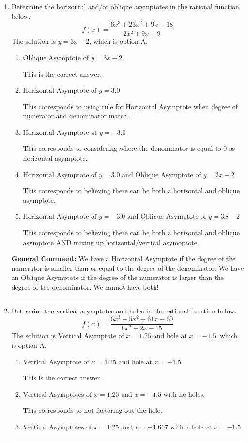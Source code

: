 \documentclass{extbook}[14pt]
\newcommand{\litem}[1]{\item #1

\rule{\textwidth}{0.4pt}}
\begin{document}
\begin{enumerate}\litem{
Determine the horizontal and/or oblique asymptotes in the rational function below.
\[ f(x) = \frac{6x^{3} +23 x^{2} +9 x -18}{2x^{2} +9 x + 9} \]The solution is \( y = 3x -2 \), which is option A.\begin{enumerate}[label=\Alph*.]
\item \( \text{Oblique Asymptote of } y = 3x -2. \)

This is the correct answer.
\item \( \text{Horizontal Asymptote of } y = 3.0  \)

This corresponds to using rule for Horizontal Asymptote when degree of numerator and denominator match.
\item \( \text{Horizontal Asymptote at } y = -3.0 \)

This corresponds to considering where the denominator is equal to 0 as horizontal asymptote.
\item \( \text{Horizontal Asymptote of } y = 3.0 \text{ and Oblique Asymptote of } y = 3x -2 \)

This corresponds to believing there can be both a horizontal and oblique asymptote.
\item \( \text{Horizontal Asymptote of } y = -3.0 \text{ and Oblique Asymptote of } y = 3x -2 \)

This corresponds to believing there can be both a horizontal and oblique asymptote AND mixing up horizontal/vertical asymoptote.
\end{enumerate}

\textbf{General Comment:} We have a Horizontal Asymptote if the degree of the numerator is smaller than or equal to the degree of the denominator. We have an Oblique Asymptote if the degree of the numerator is larger than the degree of the denominator. We cannot have both!
}
\litem{
Determine the vertical asymptotes and holes in the rational function below.
\[ f(x) = \frac{6x^{3} -5 x^{2} -61 x -60}{8x^{2} +2 x -15} \]The solution is \( \text{Vertical Asymptote of } x = 1.25 \text{ and hole at } x = -1.5 \), which is option A.\begin{enumerate}[label=\Alph*.]
\item \( \text{Vertical Asymptote of } x = 1.25 \text{ and hole at } x = -1.5 \)

This is the correct answer.
\item \( \text{Vertical Asymptotes of } x = 1.25 \text{ and } x = -1.5 \text{ with no holes.} \)

This corresponds to not factoring out the hole.
\item \( \text{Vertical Asymptotes of } x = 1.25 \text{ and } x = -1.667 \text{ with a hole at } x = -1.5 \)


\end{enumerate}}
\end{enumerate}
\end{document}
